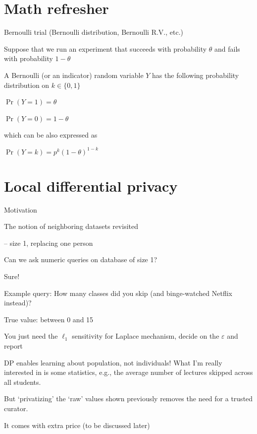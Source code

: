 \documentclass[12pt,aspectratio=169,handout]{beamer}
\begin{document}
\section{Math refresher}

\begin{frame}{Bernoulli trial (Bernoulli distribution, Bernoulli R.V., etc.)}

Suppose that we run an experiment that succeeds with probability $\theta$ and fails with probability $1 - \theta$

A Bernoulli (or an indicator) random variable $Y$ has the following probability distribution on $k \in \{0, 1\}$

$\Pr(Y = 1) = \theta$

$\Pr(Y = 0) = 1 - \theta$

which can be also expressed as

$\Pr(Y = k)=p^{k}(1-\theta)^{1-k}$
\end{frame}


\section{Local differential privacy}

\begin{frame}{Motivation}

The notion of neighboring datasets revisited

-- size 1, replacing one person

Can we ask numeric queries on database of size 1?

Sure!

Example query: How many classes did you skip (and binge-watched Netflix instead)?

True value: between 0 and 15

You just need the $\ell_1$ sensitivity for Laplace mechanism, decide on the $\varepsilon$ and report

\end{frame}


\begin{frame}{DP enables learning about population, not individuals!}
What I'm really interested in is some statistics, e.g., the average number of lectures skipped across all students.

But `privatizing' the `raw' values shown previously removes the need for a trusted curator.

It comes with extra price (to be discussed later)

\end{frame}
\end{document}
